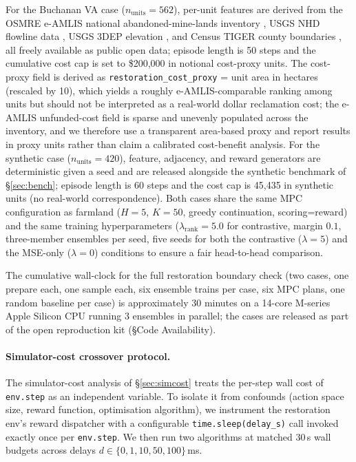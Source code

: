\documentclass[11pt]{article}
\begin{document}
For the Buchanan VA case ($n_{\text{units}}=562$), per-unit features are derived from the OSMRE e-AMLIS national abandoned-mine-lands inventory \citep{osmre2019eamlis}, USGS NHD flowline data \citep{usgs2024nhd}, USGS 3DEP elevation \citep{usgs2024_3dep}, and Census TIGER county boundaries \citep{census2023tiger}, all freely available as public open data; episode length is 50 steps and the cumulative cost cap is set to \$200{,}000 in notional cost-proxy units. The cost-proxy field is derived as \texttt{restoration\_cost\_proxy} = unit area in hectares (rescaled by 10), which yields a roughly e-AMLIS-comparable ranking among units but should not be interpreted as a real-world dollar reclamation cost; the e-AMLIS unfunded-cost field is sparse and unevenly populated across the inventory, and we therefore use a transparent area-based proxy and report results in proxy units rather than claim a calibrated cost-benefit analysis. For the synthetic case ($n_{\text{units}}=420$), feature, adjacency, and reward generators are deterministic given a seed and are released alongside the synthetic benchmark of \S\ref{sec:bench}; episode length is 60 steps and the cost cap is 45{,}435 in synthetic units (no real-world correspondence). Both cases share the same MPC configuration as farmland ($H{=}5$, $K{=}50$, greedy continuation, scoring=reward) and the same training hyperparameters ($\lambda_{\text{rank}}{=}5.0$ for contrastive, margin $0.1$, three-member ensembles per seed, five seeds for both the contrastive ($\lambda{=}5$) and the MSE-only ($\lambda{=}0$) conditions to ensure a fair head-to-head comparison.

The cumulative wall-clock for the full restoration boundary check (two cases, one prepare each, one sample each, six ensemble trains per case, six MPC plans, one random baseline per case) is approximately 30 minutes on a 14-core M-series Apple Silicon CPU running 3 ensembles in parallel; the cases are released as part of the open reproduction kit (\S Code Availability).

\paragraph{Simulator-cost crossover protocol.}\label{sec:methods-simcost}

The simulator-cost analysis of \S\ref{sec:simcost} treats the per-step wall cost of \texttt{env.step} as an independent variable. To isolate it from confounds (action space size, reward function, optimisation algorithm), we instrument the restoration env's reward dispatcher with a configurable \texttt{time.sleep(delay\_s)} call invoked exactly once per \texttt{env.step}. We then run two algorithms at matched 30\,s wall budgets across delays $d \in \{0, 1, 10, 50, 100\}$\,ms.
\end{document}
